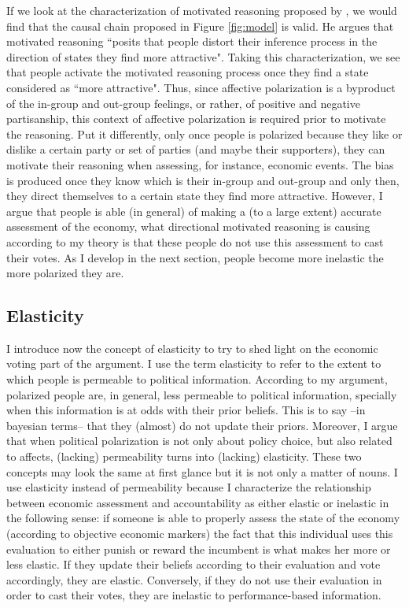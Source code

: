 \documentclass[a4paper, svgnames]{article}
\begin{document}
If we look at the characterization of motivated reasoning proposed by \cite{Thaler2021}, we would find that the causal chain proposed in Figure \ref{fig:model} is valid. He argues that motivated reasoning ``posits that people distort their inference process in the direction of states they find more attractive". Taking this characterization, we see that people activate the motivated reasoning process once they find a state considered as ``more attractive". Thus, since affective polarization is a byproduct of the in-group and out-group feelings, or rather, of positive and negative partisanship, this context of affective polarization is required prior to motivate the reasoning. Put it differently, only once people is polarized because they like or dislike a certain party or set of parties (and maybe their supporters), they can motivate their reasoning when assessing, for instance, economic events. The bias is produced once they know which is their in-group and out-group and only then, they direct themselves to a certain state they find more attractive. However, I argue that people is able (in general) of making a (to a large extent) accurate assessment of the economy, what directional motivated reasoning is causing according to my theory is that these people do not use this assessment to cast their votes. As I develop in the next section, people become more inelastic the more polarized they are.

\subsection{Elasticity}

I introduce now the concept of elasticity to try to shed light on the economic voting part of the argument. I use the term elasticity to refer to the extent to which people is permeable to political information. According to my argument, polarized people are, in general, less permeable to political information, specially when this information is at odds with their prior beliefs. This is to say --in bayesian terms-- that they (almost) do not update their priors. Moreover, I argue that when political polarization is not only about policy choice, but also related to affects, (lacking) permeability turns into (lacking) elasticity. These two concepts may look the same at first glance but it is not only a matter of nouns. I use elasticity instead of permeability because I characterize the relationship between economic assessment and accountability as either elastic or inelastic in the following sense: if someone is able to properly assess the state of the economy (according to objective economic markers) the fact that this individual uses this evaluation to either punish or reward the incumbent is what makes her more or less elastic. If they update their beliefs according to their evaluation and vote accordingly, they are elastic. Conversely, if they do not use their evaluation in order to cast their votes, they are inelastic to performance-based information.
\end{document}
